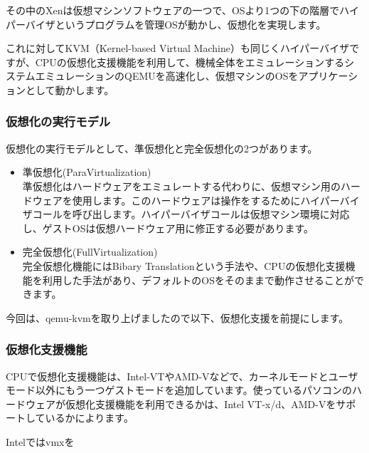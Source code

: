 \documentclass[mingoth,a4paper]{jsarticle}
\begin{document}
その中のXenは仮想マシンソフトウェアの一つで、OSより1つの下の階層でハイパーバイザというプログラムを管理OSが動かし、仮想化を実現します。

これに対してKVM（Kernel-based Virtual Machine）も同じくハイパーバイザですが、CPUの仮想化支援機能を利用して、機械全体をエミュレーションするシステムエミュレーションのQEMUを高速化し、仮想マシンのOSをアプリケーションとして動かします。


\subsubsection{仮想化の実行モデル}
仮想化の実行モデルとして、準仮想化と完全仮想化の2つがあります。
\begin{itemize}
\item 準仮想化(ParaVirtualization)\\
準仮想化はハードウェアをエミュレートする代わりに、仮想マシン用のハードウェアを使用します。このハードウェアは操作をするためにハイパーバイザコールを呼び出します。ハイパーバイザコールは仮想マシン環境に対応し、ゲストOSは仮想ハードウェア用に修正する必要があります。

\item 完全仮想化(FullVirtualization)\\
完全仮想化機能にはBibary Translationという手法や、CPUの仮想化支援機能を利用した手法があり、デフォルトのOSをそのままで動作させることができます。
\end{itemize}

今回は、qemu-kvmを取り上げましたので以下、仮想化支援を前提にします。
\subsubsection{仮想化支援機能}
CPUで仮想化支援機能は、Intel-VTやAMD-Vなどで、カーネルモードとユーザモード以外にもう一つゲストモードを追加しています。使っているパソコンのハードウェアが仮想化支援機能を利用できるかは、Intel VT-x/d、AMD-Vをサポートしているかによります。

Intelではvmxを
\end{document}

